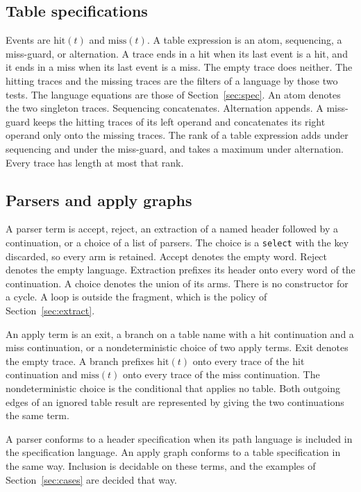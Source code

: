 \documentclass[a4paper,UKenglish,cleveref,autoref]{lipics-v2021}
\begin{document}
\subsection{Table specifications}

Events are \(\mathrm{hit}(t)\) and \(\mathrm{miss}(t)\).
A table expression is an atom, sequencing, a miss-guard, or alternation.
A trace ends in a hit when its last event is a hit, and it ends in a miss when its last event is a miss.
The empty trace does neither.
The hitting traces and the missing traces are the filters of a language by those two tests.
The language equations are those of Section~\ref{sec:spec}.
An atom denotes the two singleton traces.
Sequencing concatenates.
Alternation appends.
A miss-guard keeps the hitting traces of its left operand and concatenates its right operand only onto the missing traces.
The rank of a table expression adds under sequencing and under the miss-guard, and takes a maximum under alternation.
Every trace has length at most that rank.

\subsection{Parsers and apply graphs}

A parser term is accept, reject, an extraction of a named header followed by a continuation, or a choice of a list of parsers.
The choice is a \texttt{select} with the key discarded, so every arm is retained.
Accept denotes the empty word.
Reject denotes the empty language.
Extraction prefixes its header onto every word of the continuation.
A choice denotes the union of its arms.
There is no constructor for a cycle.
A loop is outside the fragment, which is the policy of Section~\ref{sec:extract}.

An apply term is an exit, a branch on a table name with a hit continuation and a miss continuation, or a nondeterministic choice of two apply terms.
Exit denotes the empty trace.
A branch prefixes \(\mathrm{hit}(t)\) onto every trace of the hit continuation and \(\mathrm{miss}(t)\) onto every trace of the miss continuation.
The nondeterministic choice is the conditional that applies no table.
Both outgoing edges of an ignored table result are represented by giving the two continuations the same term.

A parser conforms to a header specification when its path language is included in the specification language.
An apply graph conforms to a table specification in the same way.
Inclusion is decidable on these terms, and the examples of Section~\ref{sec:cases} are decided that way.
\end{document}
